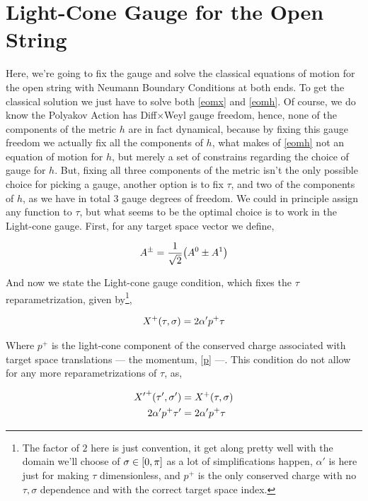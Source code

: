 \section{Light-Cone Gauge for the Open String}
\label{app-openclass}

Here, we're going to fix the gauge and solve the classical equations of motion for the open string with 
Neumann Boundary Conditions at both ends. To get the classical solution we just have to solve both
\ref{eomx} and \ref{eomh}. Of course, we do know the Polyakov Action has  Diff$\times$Weyl gauge freedom, hence, 
none of the components of the metric $h$ are in fact dynamical, because by fixing this gauge freedom we actually 
fix all the components of $h$, what makes of \ref{eomh} not an equation of motion for $h$, but merely a set of 
constrains regarding the choice of gauge for $h$. But, fixing all three components of the metric isn't the 
only possible choice for picking a gauge, another option is to fix $\tau$, and two of the components 
of $h$, as we have in total 3 gauge degrees of freedom. We could in principle assign any function to $\tau$, but 
what seems to be the optimal choice is to work in the Light-cone gauge. First, for any target space vector we define,

\begin{align*}
    A^\pm=\frac{1}{\sqrt2}\qty(A^0\pm A^1)
\end{align*}

And now we state the Light-cone gauge condition, which fixes the $\tau$ reparametrization, given by\footnote{The factor of $2$ here is just convention, it get along pretty well with the 
domain we'll choose of $\sigma\in\qty[0,\pi]$ as a lot of simplifications happen, $\alpha'$ is here just for making $\tau$ dimensionless, and $p^+$ is 
the only conserved charge with no $\tau,\sigma$ dependence and with the correct target space index.},

\begin{align*}
    X^+\qty(\tau,\sigma)=2\alpha'p^+\tau
\end{align*}

Where $p^+$ is the light-cone component of the conserved charge associated with target space translations --- the momentum, \ref{p} ---. This 
condition do not allow for any more reparametrizations of $\tau$, as,

\begin{align*}
    {X'}^+\qty(\tau',\sigma')&=X^+\qty(\tau,\sigma)\\
    2\alpha'p^+\tau'&=2\alpha'p^+\tau
\end{align*}

